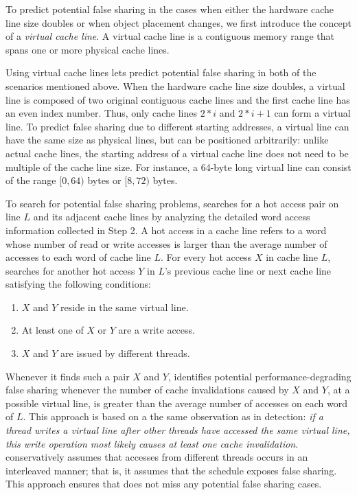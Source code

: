 To predict potential false sharing in the cases when either the hardware cache line size doubles or when object placement changes, we first 
introduce the concept of a \emph{virtual cache line}.  A virtual cache line
is a contiguous memory range that spans one or more physical cache 
lines.

Using virtual cache lines lets \Predator{} predict potential false sharing in both of the scenarios mentioned above. When the hardware cache line size doubles, a virtual line is
composed of two original contiguous cache lines and the first cache
line has an even index number.  Thus, only cache lines $2*i$ and
$2*i+1$ can form a virtual line.  To predict false sharing due to different starting
addresses, a virtual line can have the same size as physical lines,
but can be positioned arbitrarily: unlike actual cache lines, the
starting address of a virtual cache line does not need to be multiple
of the cache line size.  For instance, a 64-byte long virtual line can
consist of the range $[0,64)$ bytes or $[8,72)$ bytes.

To search for potential false sharing problems, 
\Predator{} searches for a hot access pair on line $L$ and its adjacent cache lines 
by analyzing the detailed word access information collected in Step 2. 
A hot access in a cache line refers to a word whose number of read or write accesses 
is larger than the average number of accesses to each word of cache line $L$.
For every hot access $X$ in cache line $L$, \Predator{} searches for another
hot access $Y$ in $L$'s previous cache line or next cache line satisfying
the following conditions: 

\begin{enumerate}
\item
$X$ and $Y$ reside in the same virtual line. 

\item
At least one of $X$ or $Y$ are a write access.

\item 
$X$ and $Y$ are issued by different threads.

\end{enumerate}

 
Whenever it finds such a pair $X$ and $Y$, 
\Predator{} identifies potential performance-degrading false sharing whenever
 the number of cache invalidations caused by $X$ and $Y$, at a possible virtual line, 
is greater than the average number of accesses on each word of $L$. 
This approach is based on a the same observation as in detection:
\emph{if a thread writes a virtual line after other threads 
have accessed the same virtual line, this write operation most likely causes at least one cache 
invalidation}. 
\Predator{} conservatively assumes that accesses from different threads occurs in an interleaved manner; that is, it assumes that the schedule exposes false sharing.
This approach ensures that \Predator{} does not miss any potential false sharing cases.
  
